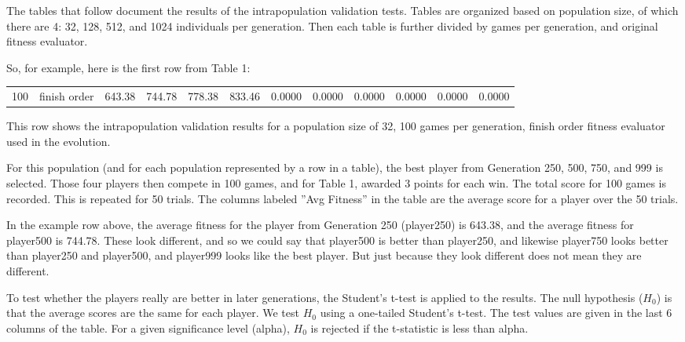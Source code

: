 \begin{landscape}
\thispagestyle{empty}
\setcounter{secnumdepth}{0}
\label{sec:appendixB}

The tables that follow document the results of the intrapopulation validation
tests. Tables are organized based on population size, of which there are 4: 32,
128, 512, and 1024 individuals per generation. Then each table is further
divided by games per generation, and original fitness evaluator.

So, for example, here is the first row from Table 1:

\begin{table}[ht]
  \centering
    \begin{tabularx}{\linewidth}{|p{1in}|p{1in}|r|r|r|r|r|r|r|r|r|r|}
 \cline{1-12}
      \multirow{1}{*}{100} & finish order & 643.38 & 744.78 & 778.38 & 833.46 & 0.0000 & 0.0000 & 0.0000 & 0.0000 & 0.0000 & 0.0000 \\
 \cline{1-12}
    \end{tabularx}%
\end{table}%

This row shows the intrapopulation validation results for a population size of
32, 100 games per generation, finish order fitness evaluator used in the
evolution.

For this population (and for each population represented by a row in a table),
the best player from Generation 250, 500, 750, and 999 is selected. Those four
players then compete in 100 games, and for Table 1, awarded 3 points for each 
win. The total score for 100 games is recorded. This is repeated for 50 trials.
The columns labeled ''Avg Fitness'' in the table are the average score for a
player over the 50 trials.

In the example row above, the average fitness for the player from Generation 250
(player250) is 643.38, and the average fitness for player500 is 744.78. These
look different, and so we could say that player500 is better than player250, and
likewise player750 looks better than player250 and player500, and player999 looks
like the best player. But just because they look different does not mean they
are different.

To test whether the players really are better in later generations, the
Student's t-test is applied to the results. The null hypothesis ($H_{0}$) is
that the average scores are the same for each player. We test $H_{0}$ using a
one-tailed Student's t-test. The test values are given in the last 6 columns of
the table. For a given significance level (alpha), $H_{0}$ is rejected if the
t-statistic is less than alpha.


\end{landscape}
